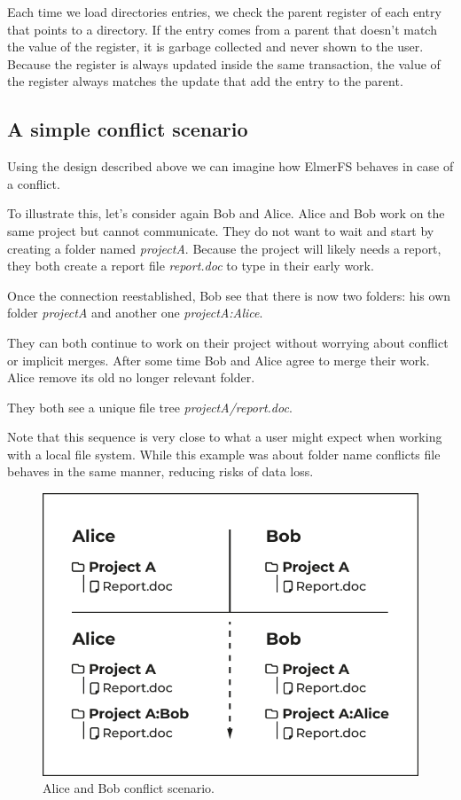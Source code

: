 \documentclass[sigconf, anonymous, 10pt]{acmart}
\begin{document}
Each time we load directories  entries, we check the parent register of each
entry that points to a directory. If the entry comes from a parent that doesn’t
match the value of the register, it is garbage collected and never shown to the user.
Because the register is always updated inside the same transaction, the
value of the register always matches the update that add the entry
to the parent.

\subsection{A simple conflict scenario}

Using the design described above we can imagine how ElmerFS behaves in case
of a conflict.

To illustrate this, let's consider again Bob and Alice. Alice and Bob work
on the same project but cannot communicate. They do not want to wait and start by creating a folder named \textit{projectA}. Because the project will likely needs a report,
they both create a report file \textit{report.doc} to type in their early work.

Once the connection reestablished, Bob see that there is now two folders:
his own folder \textit{projectA} and another one \textit{projectA:Alice}.

They can both continue to work on their project without worrying about
conflict or implicit merges. After some time Bob and Alice agree to merge
their work. Alice remove its old no longer relevant folder.

They both see a unique file tree \textit{projectA/report.doc}.

Note that this sequence is very close to what a user might expect when working with a local file system. While this example was about folder name conflicts file behaves in the same manner, reducing risks of data loss.

\begin{figure}[h]
	\caption{Alice and Bob conflict scenario.}
	\centering
	\includegraphics[scale=0.5]{AliceBob-font-des-fichiers.pdf}
\end{figure}
\end{document}
